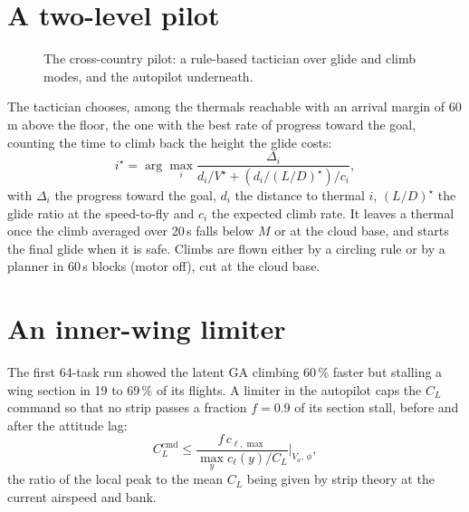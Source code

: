 \documentclass[11pt,a4paper,oneside]{report}
\newcommand{\CL}{C_L}
\begin{document}
\section{A two-level pilot}
\begin{figure}[ht]\centering
{}
\caption{The cross-country pilot: a rule-based tactician over glide and climb modes, and the autopilot underneath.}\label{fig:xcpilot}
\end{figure}

The tactician chooses, among the thermals reachable with an arrival margin of 60\,m above the floor, the one with the best rate of progress toward the goal, counting the time to climb back the height the glide costs:
\begin{equation}
i^\star = \arg\max_i \frac{\Delta_i}{d_i/V^\star + (d_i/(L/D)^\star)/c_i},
\end{equation}
with $\Delta_i$ the progress toward the goal, $d_i$ the distance to thermal $i$, $(L/D)^\star$ the glide ratio at the speed-to-fly and $c_i$ the expected climb rate. It leaves a thermal once the climb averaged over 20\,s falls below $M$ or at the cloud base, and starts the final glide when it is safe. Climbs are flown either by a circling rule or by a planner in 60\,s blocks (motor off), cut at the cloud base.

\section{An inner-wing limiter}
The first 64-task run showed the latent GA climbing 60\,\% faster but stalling a wing section in 19 to 69\,\% of its flights. A limiter in the autopilot caps the $\CL$ command so that no strip passes a fraction $f = 0.9$ of its section stall, before and after the attitude lag:
\begin{equation}
\CL^{\mathrm{cmd}} \le \frac{f\,c_{\ell,\max}}{\max_y c_\ell(y)/\CL}\bigg|_{V_a,\,\phi},
\end{equation}
the ratio of the local peak to the mean $\CL$ being given by strip theory at the current airspeed and bank.
\end{document}
